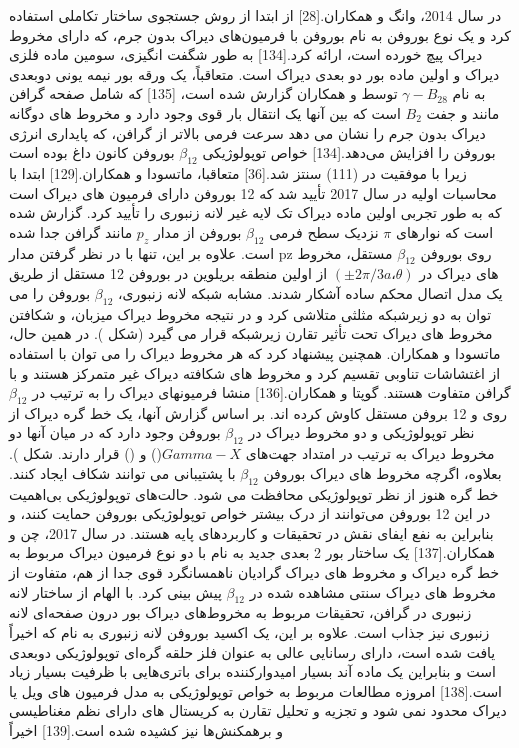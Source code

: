 در سال 2014، وانگ و همکاران.\cite{zhouSemimetallicTwoDimensionalBoron2014}[28] از ابتدا از روش جستجوی ساختار تکاملی استفاده کرد و یک نوع بوروفن به نام  بوروفن با فرمیون‌های دیراک بدون جرم، که دارای مخروط دیراک پیچ خورده است، ارائه کرد.[134] به طور شگفت انگیزی،  سومین ماده فلزی دیراک و اولین ماده بور دو بعدی دیراک است. متعاقباً، یک ورقه بور نیمه یونی دوبعدی به نام $\gamma-B_28$ توسط  و همکاران گزارش شده است، \cite{maGraphenelikeTwoDimensionalIonic2016}[135] که شامل صفحه گرافن مانند و جفت $B_2$ است که بین آنها یک انتقال بار قوی وجود دارد و مخروط های دوگانه دیراک بدون جرم را نشان می دهد سرعت فرمی بالاتر از گرافن، که پایداری انرژی بوروفن  را افزایش می‌دهد.[134] خواص توپولوژیکی $\beta_{12}$ بوروفن کانون داغ بوده است زیرا با موفقیت در  (111) سنتز شد.\cite{mannixSynthesisBorophenesAnisotropic2015}[36] متعاقبا، ماتسودا و همکاران.\cite{fengDiracFermionsBorophene2017}[129] ابتدا با محاسبات اولیه در سال 2017 تأیید شد که 12 بوروفن دارای فرمیون های دیراک است که به طور تجربی اولین ماده دیراک تک لایه غیر لانه زنبوری را تأیید کرد. گزارش شده است که نوارهای $\pi$ نزدیک سطح فرمی $\beta_{12}$ بوروفن از مدار $p_z$ مانند گرافن جدا شده است. علاوه بر این، تنها با در نظر گرفتن مدار pz روی بوروفن $\beta_{12}$ مستقل، مخروط های دیراک در $(±2\pi/3a، \theta)$ از اولین منطقه بریلوین  در بوروفن 12 مستقل از طریق یک مدل اتصال محکم ساده آشکار شدند. مشابه شبکه لانه زنبوری، $\beta_{12}$ بوروفن را می توان به دو زیرشبکه مثلثی متلاشی کرد و در نتیجه مخروط دیراک میزبان، و شکافتن مخروط های دیراک تحت تأثیر تقارن زیرشبکه قرار می گیرد (شکل ). در همین حال، ماتسودا و همکاران. همچنین پیشنهاد کرد که هر مخروط دیراک را می توان با استفاده از اغتشاشات تناوبی تقسیم کرد و مخروط های شکافته دیراک غیر متمرکز هستند و با گرافن متفاوت هستند. گوپتا و همکاران.[136] منشا فرمیونهای دیراک را به ترتیب در $\beta_{12}$ روی  و 12 بروفن مستقل کاوش کرده اند. بر اساس گزارش آنها، یک خط گره دیراک از نظر توپولوژیکی و دو مخروط دیراک در $\beta_{12}$ بوروفن وجود دارد که در میان آنها دو مخروط دیراک به ترتیب در امتداد جهت‌های $Gamma-X$() و  () قرار دارند. شکل ). بعلاوه، اگرچه مخروط های دیراک بوروفن $\beta_{12}$ با پشتیبانی  می توانند شکاف ایجاد کنند. خط گره هنوز از نظر توپولوژیکی محافظت می شود. حالت‌های توپولوژیکی بی‌اهمیت در این 12 بوروفن می‌توانند از درک بیشتر خواص توپولوژیکی بوروفن حمایت کنند، و بنابراین به نفع ایفای نقش در تحقیقات و کاربردهای پایه هستند. در سال 2017، چن و همکاران.\cite{zhangDiracNodalLines2017}[137] یک ساختار بور 2 بعدی جدید به نام  با دو نوع فرمیون دیراک مربوط به خط گره دیراک و مخروط های دیراک گرادیان ناهمسانگرد قوی جدا از هم، متفاوت از مخروط های دیراک سنتی مشاهده شده در $\beta_{12}$ پیش بینی کرد. با الهام از ساختار لانه زنبوری در گرافن، تحقیقات مربوط به مخروط‌های دیراک بور درون صفحه‌ای لانه زنبوری نیز جذاب است. علاوه بر این، یک اکسید بوروفن لانه زنبوری به نام  که اخیراً یافت شده است، دارای رسانایی عالی به عنوان فلز حلقه گره‌ای توپولوژیکی دوبعدی است و بنابراین یک ماده آند بسیار امیدوارکننده برای باتری‌هایی با ظرفیت بسیار زیاد است.\cite{hu2DHoneycombBorophene2020}[138] امروزه مطالعات مربوط به خواص توپولوژیکی به مدل فرمیون های ویل یا دیراک محدود نمی شود و تجزیه و تحلیل تقارن به کریستال های دارای نظم مغناطیسی و برهمکنش‌ها نیز کشیده شده است.\cite{bradlynDiracWeylFermions2016}[139] اخیراً  